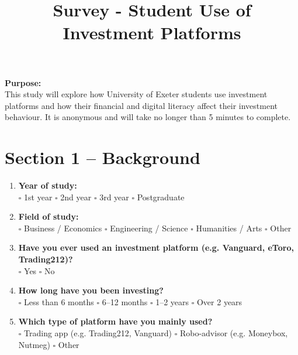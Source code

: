 \documentclass[11pt,english]{article}
\begin{document}
\title{\textbf{Survey - Student Use of Investment Platforms}}
\date{}
\maketitle
\vspace{-7em}
\thispagestyle{fancy}

\noindent
\textbf{Purpose:} \\
This study will explore how University of Exeter students use investment platforms and how
their financial and digital literacy affect their investment behaviour. It is anonymous and will
take no longer than 5 minutes to complete.

\vspace{1em}

\section*{Section 1 – Background}

\begin{enumerate}[leftmargin=1.5em,label=\textbf{\arabic*.}]
\item \textbf{Year of study:} \\
$\square$ 1st year \quad $\square$ 2nd year \quad $\square$ 3rd year \quad $\square$ Postgraduate

\item \textbf{Field of study:} \\
$\square$ Business / Economics \quad $\square$ Engineering / Science \quad $\square$ Humanities / Arts \quad $\square$ Other

\item \textbf{Have you ever used an investment platform (e.g. Vanguard, eToro, Trading212)?} \\
$\square$ Yes \quad $\square$ No

\item \textbf{How long have you been investing?} \\
$\square$ Less than 6 months \quad $\square$ 6–12 months \quad $\square$ 1–2 years \quad $\square$ Over 2 years

\item \textbf{Which type of platform have you mainly used?} \\
$\square$ Trading app (e.g. Trading212, Vanguard) \quad $\square$ Robo-advisor (e.g. Moneybox, Nutmeg) \quad $\square$ Other
\end{enumerate}
\end{document}
